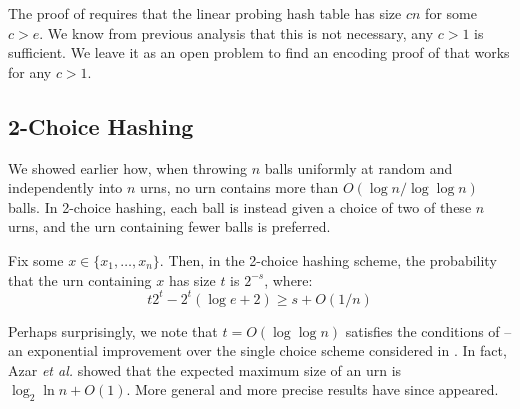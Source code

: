 \documentclass{patmorin}
\begin{document}
\begin{rem}
  The proof of  requires that the linear
  probing hash table has size $cn$ for some $c>e$.  We know from
  previous analysis that this is not necessary, any $c>1$ is
  sufficient. We leave it as an open problem to find an encoding proof
  of  that works for any $c>1$.
\end{rem}

\subsection{2-Choice Hashing}

We showed earlier how, when throwing $n$ balls uniformly at random and
independently into $n$ urns, no urn contains more than
$O(\log n/\log \log n)$ balls. In 2-choice hashing, each ball is
instead given a choice of two of these $n$ urns, and the urn
containing fewer balls is preferred.

\begin{thm}
  Fix some $x \in \{x_1, \ldots, x_n\}$. Then, in the 2-choice hashing
  scheme, the probability that the urn containing $x$ has size $t$ is
  $2^{-s}$, where:
  \[t 2^t - 2^t(\log e + 2) \geq s + O(1/n)\]
\end{thm}

Perhaps surprisingly, we note that $t = O(\log \log n)$ satisfies the
conditions of  -- an exponential improvement
over the single choice scheme considered in . In fact,
Azar {\em et al.} \cite{azar:multiplechoice} showed that the expected
maximum size of an urn is $\log_2 \ln n + O(1)$. More general and more
precise results have since appeared.
\end{document}
